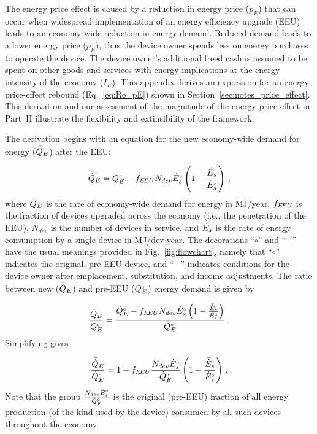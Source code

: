 

The energy price effect is caused by a reduction 
in energy price ($p_E$)
that can occur when widespread implementation 
of an energy efficiency upgrade (EEU)
leads to an economy-wide reduction in energy demand.
Reduced demand leads to a lower energy price ($p_E$), 
thus the device owner spends less on energy purchases
to operate the device.
The device owner's additional freed cash
is assumed to be spent on other goods and services
with energy implications 
at the energy intensity of the economy ($I_E$).
This appendix derives an expression for an
energy price-effect rebound (Eq.~\ref{eq:Re_pE})
shown in Section~\ref{sec:notes_price_effect}.
This derivation and our assessment of the magnitude of the energy price effect
in Part~II
illustrate the flexibility and extinsibility of the framework.

The derivation begins with an equation for the new economy-wide 
demand for energy ($\bar{\dot{Q}}_E$) after the EEU:

\begin{equation}
  \bar{\dot{Q}}_E = {}{\dot{Q}}^{\scriptscriptstyle \circ}_E - f_{E\!EU} N_{dev} {}{\dot{E}}^{\scriptscriptstyle \circ}_s \left( 1 - \frac{\bar{\dot{E}}_s}{{}{\dot{E}}^{\scriptscriptstyle \circ}_s} \right) \, ,
\end{equation}
%
where
$\dot{Q}_E$ is the rate of economy-wide demand for energy in MJ/year,
$f_{E\!EU}$ is the fraction of devices upgraded across the economy
(i.e., the penetration of the EEU),
$N_{dev}$ is the number of devices in service, and
$\dot{E}_s$ is the rate of energy consumption by a single device in MJ/dev$\cdot$year.
The decorations ``$\circ$'' and ``$-$'' have the usual meanings
provided in Fig.~\ref{fig:flowchart}, namely that
``$\circ$'' indicates the original, pre-EEU device, and
``$-$'' indicates conditions for the device owner after
emplacement, substitution, and income
adjustments.
The ratio between
new ($\bar{\dot{Q}}_E$) and
pre-EEU (${}{\dot{Q}}^{\scriptscriptstyle \circ}_E$)
energy demand is given by

\begin{equation}
  \frac{\bar{\dot{Q}}_E}{{}{\dot{Q}}^{\scriptscriptstyle \circ}_E} =
        \frac{{}{\dot{Q}}^{\scriptscriptstyle \circ}_E - f_{E\!EU} N_{dev} {}{\dot{E}}^{\scriptscriptstyle \circ}_s \left( 1 - \frac{\bar{\dot{E}}_s}{{}{\dot{E}}^{\scriptscriptstyle \circ}_s}  \right)}
        {{}{\dot{Q}}^{\scriptscriptstyle \circ}_E} \, .
\end{equation}
%
Simplifying gives

\begin{equation} \label{eq:QE_ratio}
  \frac{\bar{\dot{Q}}_E}{{}{\dot{Q}}^{\scriptscriptstyle \circ}_E} =
        1 - f_{E\!EU} \frac{N_{dev} {}{\dot{E}}^{\scriptscriptstyle \circ}_s}{{}{\dot{Q}}^{\scriptscriptstyle \circ}_E} \left( 1 - \frac{\bar{\dot{E}}_s}{{}{\dot{E}}^{\scriptscriptstyle \circ}_s}  \right) \, .
\end{equation}
%
Note that the group $\frac{N_{dev} {}{\dot{E}}^{\scriptscriptstyle \circ}_s}{{}{\dot{Q}}^{\scriptscriptstyle \circ}_E}$
is the original (pre-EEU) fraction of all energy production
(of the kind used by the device)
consumed by all such devices throughout the economy.

